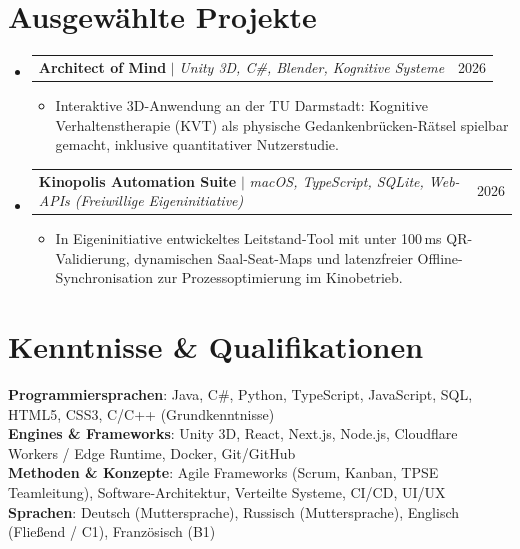 \documentclass[letterpaper,10pt]{article}
\makeatletter
\newcommand{\resumeItem}[1]{
  \item\small{
    {#1 \vspace{-2pt}}
  }
}
\newcommand{\resumeProjectHeading}[2]{
    \vspace{-1pt}\item
    \begin{tabular*}{0.98\textwidth}{l@{\extracolsep{\fill}}r}
      \small#1 & \small #2 \\
    \end{tabular*}\vspace{-5pt}
}
\newcommand{\resumeSubHeadingListStart}{\begin{itemize}[leftmargin=0.0in, label={}]}
\newcommand{\resumeSubHeadingListEnd}{\end{itemize}}
\newcommand{\resumeItemListStart}{\begin{itemize}[leftmargin=0.15in, label=\raisebox{0.25ex}{\tiny$\bullet$}]}
\newcommand{\resumeItemListEnd}{\end{itemize}\vspace{-3pt}}
\makeatother
\begin{document}
\section{Ausgew\"ahlte Projekte}
  \resumeSubHeadingListStart
    \resumeProjectHeading
      {\textbf{Architect of Mind} $|$ \emph{Unity 3D, C\#, Blender, Kognitive Systeme}}{2026}
      \resumeItemListStart
        \resumeItem{Interaktive 3D-Anwendung an der TU Darmstadt: Kognitive Verhaltenstherapie (KVT) als physische Gedankenbr\"ucken-R\"atsel spielbar gemacht, inklusive quantitativer Nutzerstudie.}
      \resumeItemListEnd
    \resumeProjectHeading
      {\textbf{Kinopolis Automation Suite} $|$ \emph{macOS, TypeScript, SQLite, Web-APIs (Freiwillige Eigeninitiative)}}{2026}
      \resumeItemListStart
        \resumeItem{In Eigeninitiative entwickeltes Leitstand-Tool mit unter 100\,ms QR-Validierung, dynamischen Saal-Seat-Maps und latenzfreier Offline-Synchronisation zur Prozessoptimierung im Kinobetrieb.}
      \resumeItemListEnd
  \resumeSubHeadingListEnd
\vspace{-3pt}

\section{Kenntnisse \& Qualifikationen}
 \begin{itemize}[leftmargin=0.15in, label={}]
    \small{\item{
     \textbf{Programmiersprachen}: Java, C\#, Python, TypeScript, JavaScript, SQL, HTML5, CSS3, C/C++ (Grundkenntnisse) \\
     \textbf{Engines \& Frameworks}: Unity 3D, React, Next.js, Node.js, Cloudflare Workers / Edge Runtime, Docker, Git/GitHub \\
     \textbf{Methoden \& Konzepte}: Agile Frameworks (Scrum, Kanban, TPSE Teamleitung), Software-Architektur, Verteilte Systeme, CI/CD, UI/UX \\
     \textbf{Sprachen}: Deutsch (Muttersprache), Russisch (Muttersprache), Englisch (Flie\ss end / C1), Franz\"osisch (B1)
    }}
 \end{itemize}
\end{document}

